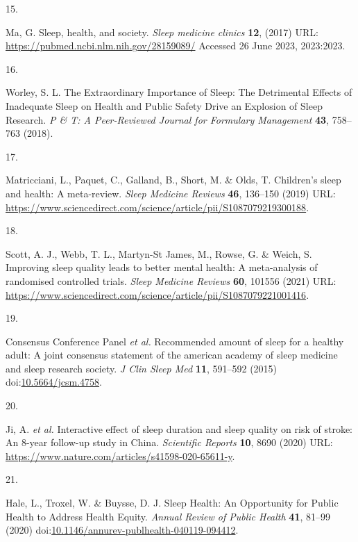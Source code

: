 \documentclass[
  10pt,
]{scrbook}
\newlength{\cslhangindent}
\newlength{\csllabelwidth}
\newlength{\cslentryspacingunit} %
\newenvironment{CSLReferences}[2] %
 {%
  \setlength{\parindent}{0pt}
  \ifodd #1
  \let\oldpar\par
  \def\par{\hangindent=\cslhangindent\oldpar}
  \fi
  \setlength{\parskip}{#2\cslentryspacingunit}
 }%
 {}
\newcommand{\CSLLeftMargin}[1]{\parbox[t]{\csllabelwidth}{#1}}
\newcommand{\CSLRightInline}[1]{\parbox[t]{\linewidth - \csllabelwidth}{#1}\break}
\let\originaltextbf\textbf
\renewcommand{\textbf}[1]{\textcolor{color1}{\textsf{\originaltextbf{#1}}}}
\begin{document}
\begin{CSLReferences}{0}{0}
\leavevmode{}%
\CSLLeftMargin{15. }%
\CSLRightInline{Ma, G. Sleep, health, and society. \emph{Sleep medicine
clinics} \textbf{12}, (2017) URL:
\url{https://pubmed.ncbi.nlm.nih.gov/28159089/} Accessed 26 June 2023,
2023:2023.}

\leavevmode{}%
\CSLLeftMargin{16. }%
\CSLRightInline{Worley, S. L. The Extraordinary Importance of Sleep: The
Detrimental Effects of Inadequate Sleep on Health and Public Safety
Drive an Explosion of Sleep Research. \emph{P \& T: A Peer-Reviewed
Journal for Formulary Management} \textbf{43}, 758--763 (2018).}

\leavevmode{}%
\CSLLeftMargin{17. }%
\CSLRightInline{Matricciani, L., Paquet, C., Galland, B., Short, M. \&
Olds, T. Children's sleep and health: A meta-review. \emph{Sleep
Medicine Reviews} \textbf{46}, 136--150 (2019) URL:
\url{https://www.sciencedirect.com/science/article/pii/S1087079219300188}.}

\leavevmode{}%
\CSLLeftMargin{18. }%
\CSLRightInline{Scott, A. J., Webb, T. L., Martyn-St James, M., Rowse,
G. \& Weich, S. Improving sleep quality leads to better mental health: A
meta-analysis of randomised controlled trials. \emph{Sleep Medicine
Reviews} \textbf{60}, 101556 (2021) URL:
\url{https://www.sciencedirect.com/science/article/pii/S1087079221001416}.}

\leavevmode{}%
\CSLLeftMargin{19. }%
\CSLRightInline{Consensus Conference Panel \emph{et al.} Recommended
amount of sleep for a healthy adult: A joint consensus statement of the
american academy of sleep medicine and sleep research society. \emph{J
Clin Sleep Med} \textbf{11}, 591--592 (2015)
doi:\href{https://doi.org/10.5664/jcsm.4758}{10.5664/jcsm.4758}.}

\leavevmode{}%
\CSLLeftMargin{20. }%
\CSLRightInline{Ji, A. \emph{et al.} Interactive effect of sleep
duration and sleep quality on risk of stroke: An 8-year follow-up study
in China. \emph{Scientific Reports} \textbf{10}, 8690 (2020) URL:
\url{https://www.nature.com/articles/s41598-020-65611-y}.}

\leavevmode{}%
\CSLLeftMargin{21. }%
\CSLRightInline{Hale, L., Troxel, W. \& Buysse, D. J. Sleep Health: An
Opportunity for Public Health to Address Health Equity. \emph{Annual
Review of Public Health} \textbf{41}, 81--99 (2020)
doi:\href{https://doi.org/10.1146/annurev-publhealth-040119-094412}{10.1146/annurev-publhealth-040119-094412}.}


\end{CSLReferences}
\end{document}
